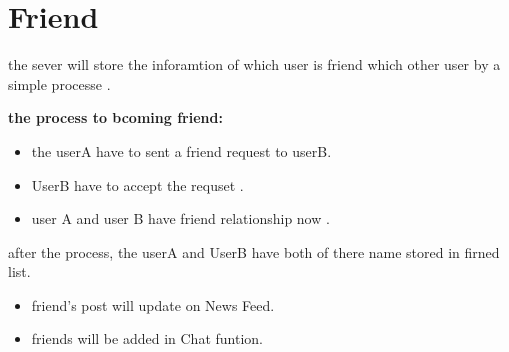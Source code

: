 \section {Friend}

the sever will store the inforamtion of which user is friend which other user by a simple processe .

\textbf{the process to bcoming friend:}
\begin{itemize}
\item the userA have to sent a friend request to userB.
\item UserB have to accept the requset .
\item user A and user B have friend relationship now .
\end{itemize}


after the process, the userA and UserB have both of there name stored in firned list.
\begin{itemize}
\textbf{Funtion after become friend}
\item friend's post will update on News Feed.
\item friends will be added in Chat funtion.
\end{itemize}